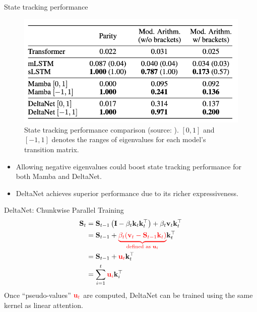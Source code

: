 \begin{frame}{State tracking performance}
    \begin{figure}
        \centering
        \includegraphics[width=.75\linewidth]{figure/state_tracking.png}
        \caption{State tracking performance comparison (source: \cite{Grazzi2024UnlockingSI}). $[0,1]$ and $[-1,1]$ denotes the ranges of eigenvalues for each model's transition matrix.}
    \end{figure}
    \vspace{-5mm}
   \begin{itemize}
    \item {\color{red}Allowing negative eigenvalues} could boost state tracking performance for both Mamba and DeltaNet.
    \item DeltaNet achieves superior performance due to its {\color{red}richer expressiveness}.
   \end{itemize}
\end{frame}

\begin{frame}{DeltaNet: Chunkwise Parallel Training}
    \begin{align*}
        \mathbf{S}_t &= \mathbf{S}_{t-1} \left(\mathbf{I} - \beta_t \mathbf{k}_t \mathbf{k}_t^\top\right) + \beta_t \mathbf{v}_t \mathbf{k}_t^\top \\
        &= \mathbf{S}_{t-1} + {\color{red}\underbrace{\beta_t(\mathbf{v}_t - \mathbf{S}_{t-1} \mathbf{k}_t)}_{\text{defined as } \mathbf{u}_t}} \mathbf{k}_t^\top \\
        &= \mathbf{S}_{t-1} + {\color{red}\mathbf{u}_t} \mathbf{k}_t^\top \\
        &= \sum_{i=1}^{t} {\color{red}\mathbf{u}_i} \mathbf{k}_i^\top
    \end{align*}    Once ``pseudo-values'' ${\color{red}\mathbf{u}_t}$ are computed, DeltaNet can be trained using the same kernel as linear attention.
\end{frame}


